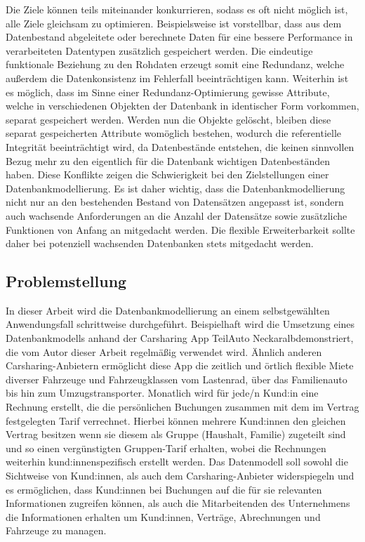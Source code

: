 Die Ziele können teils miteinander konkurrieren, sodass es oft nicht möglich ist, alle Ziele gleichsam zu optimieren. Beispielsweise ist vorstellbar, dass aus dem Datenbestand abgeleitete oder berechnete Daten für eine bessere Performance in verarbeiteten Datentypen zusätzlich gespeichert werden. Die eindeutige funktionale Beziehung zu den Rohdaten erzeugt somit eine Redundanz, welche außerdem die Datenkonsistenz im Fehlerfall beeinträchtigen kann. Weiterhin ist es möglich, dass im Sinne einer Redundanz-Optimierung gewisse Attribute, welche in verschiedenen Objekten der Datenbank in identischer Form vorkommen, separat gespeichert werden. Werden nun die Objekte gelöscht, bleiben diese separat gespeicherten Attribute womöglich bestehen, wodurch die referentielle Integrität beeinträchtigt wird, da Datenbestände entstehen, die keinen sinnvollen Bezug mehr zu den eigentlich für die Datenbank wichtigen Datenbeständen haben. Diese Konflikte zeigen die Schwierigkeit bei den Zielstellungen einer Datenbankmodellierung. Es ist daher wichtig, dass die Datenbankmodellierung nicht nur an den bestehenden Bestand von Datensätzen angepasst ist, sondern auch wachsende Anforderungen an die Anzahl der Datensätze sowie zusätzliche Funktionen von Anfang an mitgedacht werden. Die flexible Erweiterbarkeit sollte daher bei potenziell wachsenden Datenbanken stets mitgedacht werden.

\subsection{Problemstellung}
\label{subsection:Problemstellung}
In dieser Arbeit wird die Datenbankmodellierung an einem selbstgewählten Anwendungsfall schrittweise durchgeführt. Beispielhaft wird die Umsetzung eines Datenbankmodells anhand der Carsharing App \glqq TeilAuto Neckaralb\grqq demonstriert, die vom Autor dieser Arbeit regelmä{\ss}ig verwendet wird. Ähnlich anderen Carsharing-Anbietern ermöglicht diese App die zeitlich und örtlich flexible Miete diverser Fahrzeuge und Fahrzeugklassen vom Lastenrad, über das Familienauto bis hin zum Umzugstransporter. Monatlich wird für jede/n Kund:in eine Rechnung erstellt, die die persönlichen Buchungen zusammen mit dem im Vertrag festgelegten Tarif verrechnet. Hierbei können mehrere Kund:innen den gleichen Vertrag besitzen wenn sie diesem als Gruppe (Haushalt, Familie) zugeteilt sind und so einen vergünstigten Gruppen-Tarif erhalten, wobei die Rechnungen weiterhin kund:innenspezifisch erstellt werden. Das Datenmodell soll sowohl die Sichtweise von Kund:innen, als auch dem Carsharing-Anbieter widerspiegeln und es ermöglichen, dass Kund:innen bei Buchungen auf die für sie relevanten Informationen zugreifen können, als auch die Mitarbeitenden des Unternehmens die Informationen erhalten um Kund:innen, Verträge, Abrechnungen und Fahrzeuge zu managen.

